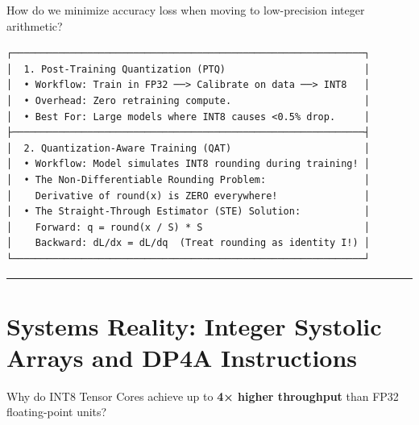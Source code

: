 \documentclass[
  letterpaper,
]{scrbook}
\begin{document}
How do we minimize accuracy loss when moving to low-precision integer
arithmetic?

\begin{verbatim}
┌─────────────────────────────────────────────────────────────┐
│  1. Post-Training Quantization (PTQ)                        │
│  • Workflow: Train in FP32 ──> Calibrate on data ──> INT8   │
│  • Overhead: Zero retraining compute.                       │
│  • Best For: Large models where INT8 causes <0.5% drop.     │
├─────────────────────────────────────────────────────────────┤
│  2. Quantization-Aware Training (QAT)                       │
│  • Workflow: Model simulates INT8 rounding during training! │
│  • The Non-Differentiable Rounding Problem:                 │
│    Derivative of round(x) is ZERO everywhere!               │
│  • The Straight-Through Estimator (STE) Solution:           │
│    Forward: q = round(x / S) * S                            │
│    Backward: dL/dx = dL/dq  (Treat rounding as identity I!) │
└─────────────────────────────────────────────────────────────┘
\end{verbatim}

\begin{center}\rule{0.5\linewidth}{0.5pt}\end{center}

\section{Systems Reality: Integer Systolic Arrays and DP4A
Instructions}\label{systems-reality-integer-systolic-arrays-and-dp4a-instructions}

Why do INT8 Tensor Cores achieve up to \textbf{4× higher throughput}
than FP32 floating-point units?
\end{document}
